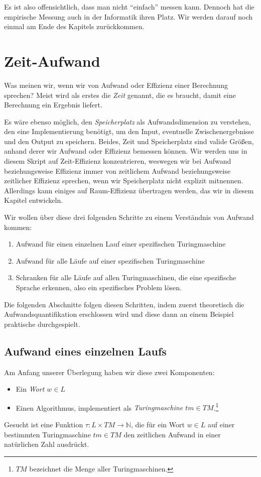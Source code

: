 Es ist also offensichtlich,
dass man nicht ``einfach'' messen kann.
Dennoch hat die empirische Messung auch in der Informatik ihren Platz.
Wir werden darauf noch einmal am Ende des Kapitels zurückkommen.

\section{Zeit-Aufwand}

Was meinen wir, wenn wir von Aufwand oder Effizienz einer Berechnung sprechen?
Meist wird als erstes die \emph{Zeit} genannt,
die es braucht,
damit eine Berechnung ein Ergebnis liefert.

Es wäre ebenso möglich,
den \emph{Speicherplatz} als Aufwandsdimension zu verstehen,
den eine Implementierung benötigt,
um den Input,
eventuelle Zwischenergebnisse
und den Output zu speichern.
Beides, Zeit und Speicherplatz sind valide Größen,
anhand derer wir Aufwand oder Effizienz bemessen können.
Wir werden uns in diesem Skript auf Zeit-Effizienz konzentrieren,
weswegen wir bei Aufwand beziehungsweise Effizienz immer von
zeitlichem Aufwand beziehungsweise zeitlicher Effizienz sprechen,
wenn wir Speicherplatz nicht explizit mitnennen.
Allerdings kann einiges auf Raum-Effizienz übertragen werden,
das wir in diesem Kapitel entwickeln.

Wir wollen über diese drei folgenden Schritte zu einem Verständnis von Aufwand kommen:
\begin{enumerate}
    \item Aufwand für einen einzelnen Lauf einer spezifischen Turingmaschine
    \item Aufwand für alle Läufe auf einer spezifischen Turingmaschine
    \item Schranken für alle Läufe auf allen Turingmaschinen, 
        die eine spezifische Sprache erkennen, also ein spezifisches Problem lösen.
\end{enumerate}

Die folgenden Abschnitte folgen diesen Schritten,
indem zuerst theoretisch die Aufwandsquantifikation erschlossen wird
und diese dann an einem Beispiel praktische durchgespielt.

\subsection{Aufwand eines einzelnen Laufs}
Am Anfang unserer Überlegung haben wir diese zwei Komponenten:
\begin{itemize}
    \item Ein \emph{Wort $w \in L$}
    \item Einen Algorithmus,
        implementiert als \emph{Turingmaschine $tm \in TM$}.\footnote{
            $TM$ bezeichnet die Menge aller Turingmaschinen.}
\end{itemize}
Gesucht ist eine Funktion $\tau: L \times TM \rightarrow \mathbb{N}$,
die für ein Wort $w \in L$ auf einer bestimmten Turingmaschine $tm \in TM$
den zeitlichen Aufwand in einer natürlichen Zahl ausdrückt.

